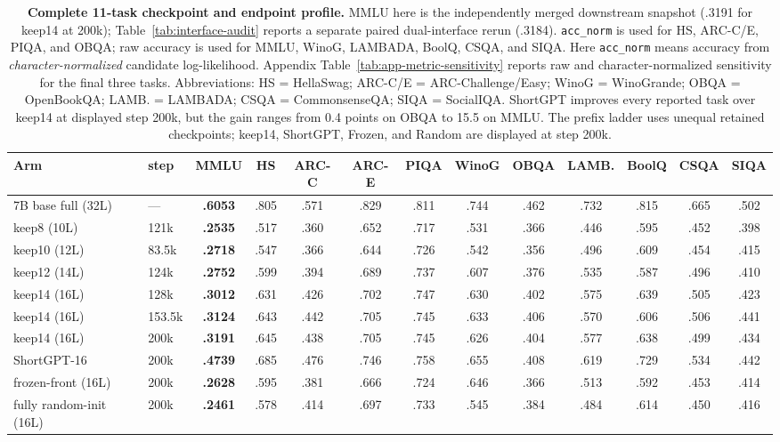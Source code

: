 \begin{table}[t]
\centering
\scriptsize
\setlength{\tabcolsep}{2.2pt}
\begin{tabular}{@{}llccccccccccc@{}}
\toprule
\textbf{Arm} & \textbf{step} & \textbf{MMLU} & \textbf{HS} &
\textbf{ARC-C} & \textbf{ARC-E} & \textbf{PIQA} & \textbf{WinoG} &
\textbf{OBQA} & \textbf{LAMB.} & \textbf{BoolQ} & \textbf{CSQA} &
\textbf{SIQA} \\
\midrule
7B base full (32L)       & ---    & \textbf{.6053} & .805 & .571 & .829 & .811 & .744 & .462 & .732 & .815 & .665 & .502 \\
keep8 (10L)              & 121k   & \textbf{.2535} & .517 & .360 & .652 & .717 & .531 & .366 & .446 & .595 & .452 & .398 \\
keep10 (12L)             & 83.5k  & \textbf{.2718} & .547 & .366 & .644 & .726 & .542 & .356 & .496 & .609 & .454 & .415 \\
keep12 (14L)             & 124k   & \textbf{.2752} & .599 & .394 & .689 & .737 & .607 & .376 & .535 & .587 & .496 & .410 \\
keep14 (16L)             & 128k   & \textbf{.3012} & .631 & .426 & .702 & .747 & .630 & .402 & .575 & .639 & .505 & .423 \\
keep14 (16L)             & 153.5k & \textbf{.3124} & .643 & .442 & .705 & .745 & .633 & .406 & .570 & .606 & .506 & .441 \\
keep14 (16L)             & 200k   & \textbf{.3191} & .645 & .438 & .705 & .745 & .626 & .404 & .577 & .638 & .499 & .434 \\
ShortGPT-16              & 200k   & \textbf{.4739} & .685 & .476 & .746 & .758 & .655 & .408 & .619 & .729 & .534 & .442 \\
frozen-front (16L)       & 200k   & \textbf{.2628} & .595 & .381 & .666 & .724 & .646 & .366 & .513 & .592 & .453 & .414 \\
fully random-init (16L)  & 200k   & \textbf{.2461} & .578 & .414 & .697 & .733 & .545 & .384 & .484 & .614 & .450 & .416 \\
\bottomrule
\end{tabular}
\caption{\textbf{Complete 11-task checkpoint and endpoint profile.}
MMLU here is the independently merged downstream snapshot (.3191 for keep14 at
200k); Table~\ref{tab:interface-audit} reports a separate paired
dual-interface rerun (.3184).
\texttt{acc\_norm} is used for HS, ARC-C/E, PIQA, and OBQA; raw accuracy is
used for MMLU, WinoG, LAMBADA, BoolQ, CSQA, and SIQA. Here
\texttt{acc\_norm} means accuracy from \emph{character-normalized} candidate
log-likelihood. Appendix Table~\ref{tab:app-metric-sensitivity} reports raw
and character-normalized sensitivity for the final three tasks. Abbreviations: HS = HellaSwag;
ARC-C/E = ARC-Challenge/Easy; WinoG = WinoGrande; OBQA = OpenBookQA; LAMB. =
LAMBADA; CSQA = CommonsenseQA; SIQA = SocialIQA. ShortGPT improves every
reported task over keep14 at displayed step 200k, but the gain
ranges from 0.4 points on OBQA to 15.5 on MMLU. The prefix ladder uses unequal
retained checkpoints; keep14, ShortGPT, Frozen, and Random are displayed at
step 200k.}
\label{tab:downstream}
\end{table}
